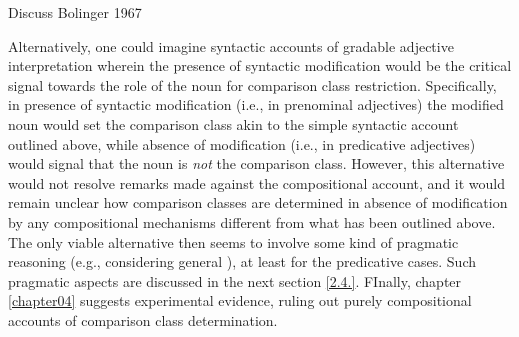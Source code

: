 Discuss Bolinger 1967

Alternatively, one could imagine syntactic accounts of gradable adjective interpretation wherein the presence of syntactic modification would be the critical signal towards the role of the noun for comparison class restriction. Specifically, in presence of syntactic modification (i.e., in prenominal adjectives) the modified noun would set the comparison class akin to the simple syntactic account outlined above,  while absence of modification (i.e., in predicative adjectives) would signal that the noun is \emph{not} the comparison class. However, this alternative would not resolve remarks made against the compositional account, and it would remain unclear how comparison classes are determined in absence of modification by any compositional mechanisms different from what has been outlined above. The only viable alternative then seems to involve some kind of pragmatic reasoning (e.g., considering general \textcite[world knowledge][]{tessler2017warm}), at least for the predicative cases. Such pragmatic aspects are discussed in the next section \ref{2.4.}. FInally, chapter \ref{chapter04} suggests experimental evidence, ruling out purely compositional accounts of comparison class determination. 

